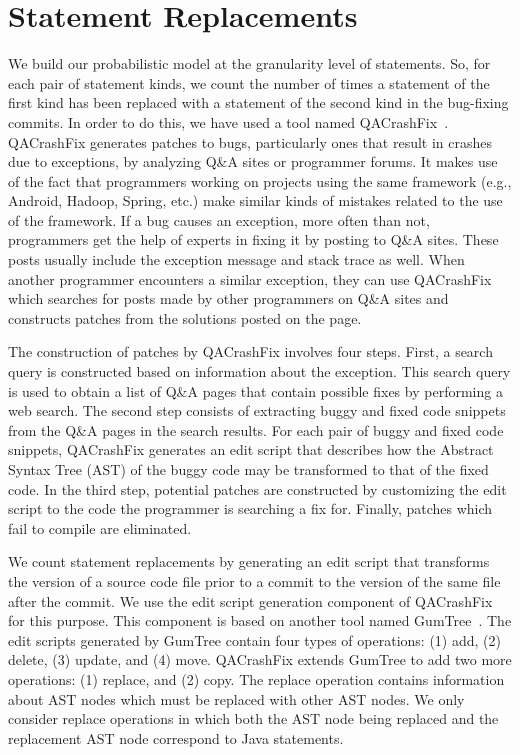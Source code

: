 
\section{Statement Replacements}
\label{sec:statement-replacements}

We build our probabilistic model at the granularity level of statements.
So, for each pair of statement kinds, we count the number of times a statement of the first kind
has been replaced with a statement of the second kind in the bug-fixing commits. In order to do this, we have used a tool named QACrashFix~\cite{Gao2015}. QACrashFix generates patches to bugs, particularly ones that result in crashes due to exceptions, by analyzing Q\&A sites or programmer forums. It makes use of the fact that programmers working on projects using the same framework (e.g., Android, Hadoop, Spring, etc.) make similar kinds of mistakes related to the use of the framework. If a bug causes an exception, more often than not, programmers get the help of experts in fixing it by posting to Q\&A sites. These posts usually include the exception message and stack trace as well. When another programmer encounters a similar exception, they can use QACrashFix which searches for posts made by other programmers on Q\&A sites and constructs patches from the solutions posted on the page.

The construction of patches by QACrashFix involves four steps. First, a search query is constructed based on information about the exception. This search query is used to obtain a list of Q\&A pages that contain possible fixes by performing a web search. The second step consists of extracting buggy and fixed code snippets from the Q\&A pages in the search results. For each pair of buggy and fixed code snippets, QACrashFix generates an edit script that describes how the Abstract Syntax Tree (AST) of the buggy code may be transformed to that of the fixed code. In the third step, potential patches are constructed by customizing the edit script to the code the programmer is searching a fix for. Finally, patches which fail to compile are eliminated.

We count statement replacements by generating an edit script that transforms the version of a source code file prior to a commit to the version of the same file after the commit. We use the edit script generation component of QACrashFix for this purpose. This component is based on another tool named GumTree~\cite{Falleri2014}. The edit scripts generated by GumTree contain four types of operations: (1) add, (2) delete, (3) update, and (4) move. QACrashFix extends GumTree to add two more operations: (1) replace, and (2) copy. The replace operation contains information about AST nodes which must be replaced with other AST nodes. We only consider replace operations in which both the AST node being replaced and the replacement AST node correspond to Java statements.